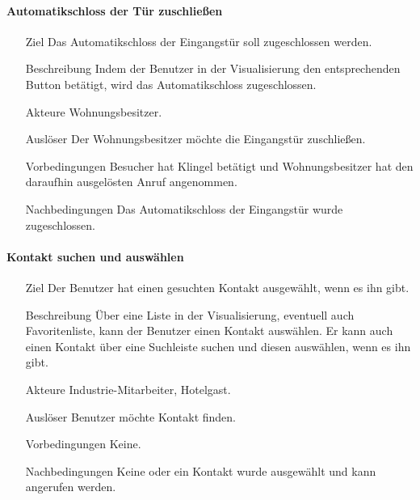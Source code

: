 \paragraph{Automatikschloss der Tür zuschließen}
    \begin{itemize}
        \item[Ziel]
        Das Automatikschloss der Eingangstür soll zugeschlossen werden.
        \item[Beschreibung]
        Indem der Benutzer in der Visualisierung den entsprechenden Button betätigt, wird das Automatikschloss zugeschlossen.
        \item[Akteure]
        Wohnungsbesitzer.
        \item[Auslöser]
        Der Wohnungsbesitzer möchte die Eingangstür zuschließen.
        \item[Vorbedingungen]
        Besucher hat Klingel betätigt und Wohnungsbesitzer hat den daraufhin ausgelösten Anruf angenommen.
        \item[Nachbedingungen]
        Das Automatikschloss der Eingangstür wurde zugeschlossen.
        \end{itemize}

\paragraph{Kontakt suchen und auswählen}
    \begin{itemize}
        \item[Ziel]
        Der Benutzer hat einen gesuchten Kontakt ausgewählt, wenn es ihn gibt.
        \item[Beschreibung]
        Über eine Liste in der Visualisierung, eventuell auch Favoritenliste, kann der Benutzer einen Kontakt auswählen.
        Er kann auch einen Kontakt über eine Suchleiste suchen und diesen auswählen, wenn es ihn gibt.
        \item[Akteure]
        Industrie-Mitarbeiter, Hotelgast.
        \item[Auslöser]
        Benutzer möchte Kontakt finden.
        \item[Vorbedingungen]
        Keine.
        \item[Nachbedingungen]
        Keine oder ein Kontakt wurde ausgewählt und kann angerufen werden.
        \end{itemize}

